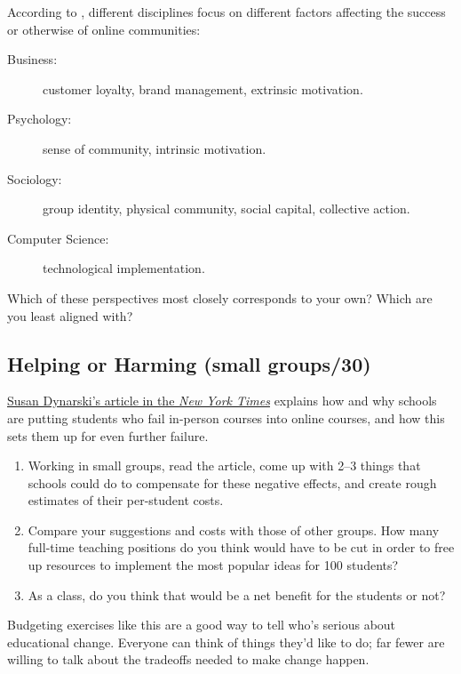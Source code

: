According to \cite{Irib2009}, different disciplines focus on
different factors affecting the success or otherwise of online
communities:

\begin{description}
\item[Business:]
customer loyalty, brand management, extrinsic motivation.
\item[Psychology:]
sense of community, intrinsic motivation.
\item[Sociology:]
group identity, physical community, social capital, collective
action.
\item[Computer Science:]
technological implementation.
\end{description}

Which of these perspectives most closely corresponds to your own? Which
are you least aligned with?

\subsection*{Helping or Harming (small groups/30)}

\href{https://www.nytimes.com/2018/01/19/business/online-courses-are-harming-the-students-who-need-the-most-help.html}{Susan Dynarski's article in the \emph{New York Times}}
explains how and why schools are putting students who fail in-person courses
into online courses, and how this sets them up for even further failure.

\begin{enumerate}
\item
  Working in small groups, read the article, come up with 2--3 things
  that schools could do to compensate for these negative effects, and
  create rough estimates of their per-student costs.
\item
  Compare your suggestions and costs with those of other groups. How
  many full-time teaching positions do you think would have to be cut
  in order to free up resources to implement the most popular ideas
  for 100 students?
\item
  As a class, do you think that would be a net benefit for the
  students or not?
\end{enumerate}

Budgeting exercises like this are a good way to tell who's serious about
educational change. Everyone can think of things they'd like to do; far
fewer are willing to talk about the tradeoffs needed to make change
happen.
